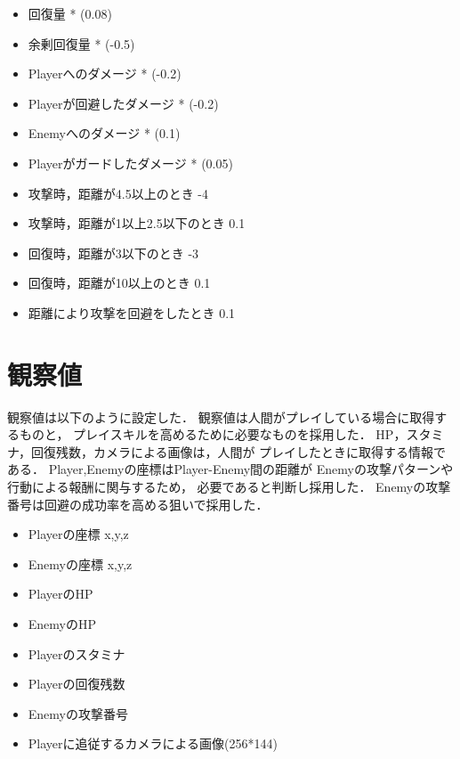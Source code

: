 \documentclass[a4paper,12pt,oneside,openany,titlepage]{jreport}
\begin{document}
 \begin{itemize}[itemsep=1pt, leftmargin=27pt, labelsep=5pt, parsep=0pt]
   \item 回復量 * (0.08)
   \item 余剰回復量 * (-0.5)
   \item Playerへのダメージ * (-0.2)
   \item Playerが回避したダメージ * (-0.2)
   \item Enemyへのダメージ * (0.1)
   \item Playerがガードしたダメージ * (0.05)
   \item 攻撃時，距離が4.5以上のとき -4
   \item 攻撃時，距離が1以上2.5以下のとき 0.1
   \item 回復時，距離が3以下のとき -3
   \item 回復時，距離が10以上のとき 0.1
   \item 距離により攻撃を回避をしたとき 0.1
 \end{itemize}
 
 
 \section{観察値}
 観察値は以下のように設定した．
 観察値は人間がプレイしている場合に取得するものと，
 プレイスキルを高めるために必要なものを採用した．
 HP，スタミナ，回復残数，カメラによる画像は，人間が
 プレイしたときに取得する情報である．
 Player,Enemyの座標はPlayer-Enemy間の距離が
 Enemyの攻撃パターンや行動による報酬に関与するため，
 必要であると判断し採用した．
 Enemyの攻撃番号は回避の成功率を高める狙いで採用した．
 
 \begin{itemize}[itemsep=1pt, leftmargin=27pt, labelsep=5pt, parsep=0pt]
   \item Playerの座標 x,y,z
   \item Enemyの座標 x,y,z
   \item PlayerのHP
   \item EnemyのHP
   \item Playerのスタミナ
   \item Playerの回復残数  
   \item Enemyの攻撃番号
   \item Playerに追従するカメラによる画像(256*144)
 \end{itemize}
 
 
\end{document}
